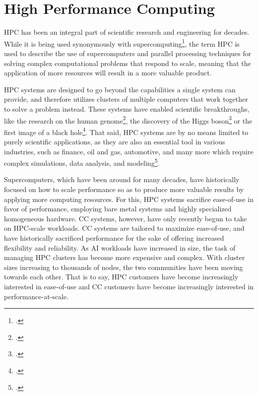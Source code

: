 \section{High Performance Computing}
\label{sec:CDA_HPC}

\gls{HPC} has been an integral part of scientific research and engineering for decades.
While it is being used synonymously with supercomputing\footcite{sterlingHighPerformanceComputing2017},
the term \ac{HPC} is used to describe the use of supercomputers and parallel processing techniques for solving complex computational problems that respond to scale, meaning that the application of more resources will result in a more valuable product.

\ac{HPC} systems are designed to go beyond the capabilities a single system can provide,
and therefore utilizes clusters of multiple computers that work together to solve a problem instead.
These systems have enabled scientific breakthroughs,
like the research on the human genome\footcite{schadtComputationalSolutionsLargescale2010},
the discovery of the Higgs boson\footcite{belyaevHighPerformanceComputing2017} or the first image of a black hole\footcite{hlrshighperformancecomputingcenterstuttgartHLRSHighPerformance}.
That said, \ac{HPC} systems are by no means limited to purely scientific applications,
as they are also an essential tool in various industries, such as finance, oil and gas, automotive, and many more which
require complex simulations, data analysis, and modeling\footcite{fortunebusinessinsightsHighPerformanceComputing}.

Supercomputers, which have been around for many decades, have historically focused on how to scale performance so as to produce more valuable results by applying more computing resources.
For this, \ac{HPC} systems sacrifice ease-of-use in favor of performance, employing \gls{bare metal} systems and highly specialized homogeneous hardware.  \ac{CC} systems,
however, have only recently begun to take on \ac{HPC}-scale workloads.
\ac{CC} systems are tailored to maximize ease-of-use, and have historically sacrificed performance for the sake of offering increased flexibility and reliability.
As \ac{AI} workloads have increased in size, the task of managing \ac{HPC} clusters has become more expensive and complex.
With cluster sizes increasing to thousands of nodes, the two communities have been moving towards each other.
That is to say, \ac{HPC} customers have become increasingly interested in ease-of-use and \ac{CC} customers have become increasingly interested in performance-at-scale.

